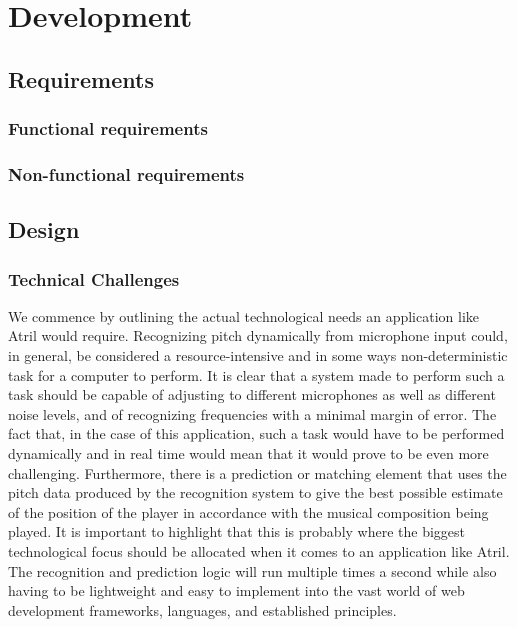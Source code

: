 \chapter{Development}

\section{Requirements}

\subsection{Functional requirements}

\subsection{Non-functional requirements}

\section{Design}

\subsection{Technical Challenges}



We commence by outlining the actual technological needs an
application like Atril would require. Recognizing pitch dynamically from
microphone input could, in general, be considered a resource-intensive and in
some ways non-deterministic task for a computer to perform. It is clear that
a system made to perform such a task should be capable of adjusting to
different microphones as well as different noise levels, and of recognizing
frequencies with a minimal margin of error. The fact that, in the case of
this application, such a task would have to be performed dynamically and in
real time would mean that it would prove to be even more challenging.
Furthermore, there is a prediction or matching element that uses the pitch
data produced by the recognition system to give the best possible estimate of
the position of the player in accordance with the musical composition being
played. It is important to highlight that this is probably where the biggest
technological focus should be allocated when it comes to an application like
Atril. The recognition and prediction logic will run multiple times a second
while also having to be lightweight and easy to implement into the vast world
of web development frameworks, languages, and established principles.


